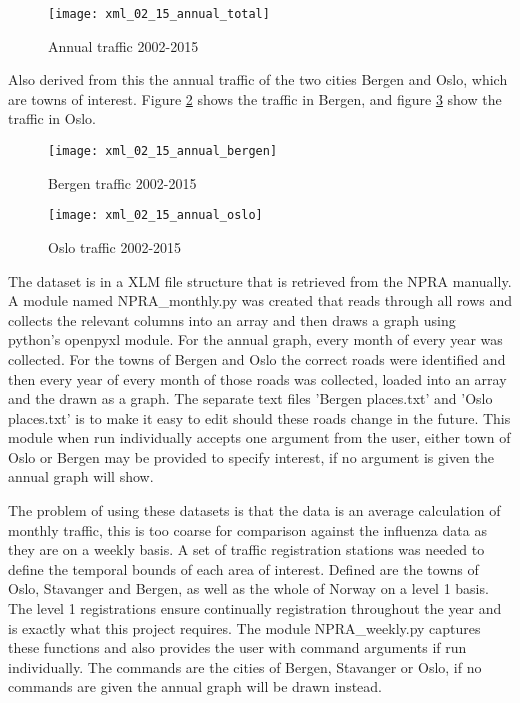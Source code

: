 \begin{figure}[ht]
\texttt{[image: xml\_02\_15\_annual\_total]}
\centering
\caption{Annual traffic 2002-2015}
\label{fig:anualtotal}
\end{figure}

Also derived from this the annual traffic of the two cities Bergen and Oslo, which are towns of interest. Figure \ref{fig:anualbergen} shows the traffic in Bergen, and figure \ref{fig:anualoslo} show the traffic in Oslo.

\begin{figure}[ht]
\texttt{[image: xml\_02\_15\_annual\_bergen]}
\centering
\caption{Bergen traffic 2002-2015}
\label{fig:anualbergen}
\end{figure}

\begin{figure}[ht]
\texttt{[image: xml\_02\_15\_annual\_oslo]}
\centering
\caption{Oslo traffic 2002-2015}
\label{fig:anualoslo}
\end{figure}
The dataset is in a XLM file structure that is retrieved from the NPRA manually. A module named NPRA\_monthly.py was created that reads through all rows and collects the relevant columns into an array and then draws a graph using python's openpyxl module. For the annual graph, every month of every year was collected. For the towns of Bergen and Oslo the correct roads were identified and then every year of every month of those roads was collected, loaded into an array and the drawn as a graph. The separate text files 'Bergen places.txt' and 'Oslo places.txt' is to make it easy to edit should these roads change in the future. This module when run individually accepts one argument from the user, either town of Oslo or Bergen may be provided to specify interest, if no argument is given the annual graph will show.

The problem of using these datasets is that the data is an average calculation of monthly traffic, this is too coarse for comparison against the influenza data as they are on a weekly basis. A set of traffic registration stations was needed to define the temporal bounds of each area of interest. Defined are the towns of Oslo, Stavanger and Bergen, as well as the whole of Norway on a level 1 basis. The level 1 registrations ensure continually registration throughout the year and is exactly what this project requires. The module NPRA\_weekly.py captures these functions and also provides the user with command arguments if run individually. The commands are the cities of Bergen, Stavanger or Oslo, if no commands are given the annual graph will be drawn instead.

